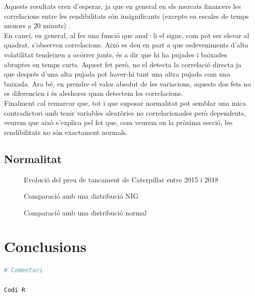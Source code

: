 \documentclass{article}
\numberwithin{table}{section}
\numberwithin{figure}{section}
\numberwithin{equation}{section}
\begin{document}
Aquests resultats eren d'esperar, ja que en general en els mercats financers les correlacions entre les rendibilitats són insignificants (excepte en escales de temps menors a 20 minuts) \cite{20}.\\
En canvi, en general, al fer una funció que anul·li el signe, com pot ser elevar al quadrat, s’observen correlacions. Això es deu en part a que esdeveniments d’alta volatilitat tendeixen a ocórrer junts, és a dir que hi ha pujades i baixades abruptes en temps curts. Aquest fet però, no el detecta la correlació directa ja que després d’una alta pujada pot haver-hi tant una altra pujada com una baixada. Ara bé, en prendre el valor absolut de les variacions, aquests dos fets no es diferencien i és aleshores quan detectem les correlacions.\\
Finalment cal remarcar que, tot i que suposar normalitat pot semblar una mica contradictori amb tenir variables aleatòries no correlacionades però dependents, veurem que això s’explica pel fet que, com veurem en la pròxima secció, les rendibilitats no són exactament normals.







\subsection{Normalitat}%




\begin{figure}[H]
	\centering \sffamily \small
	
	\caption{Evolució del preu de tancament de Caterpillar entre 2015 i 2018}
	\label{fig:distribucio rendibilitats}
\end{figure}
\begin{figure}[H]
	\centering \sffamily \small
	
	\caption{Comparació amb una distribució NIG}
	\label{fig:comparacio nig}
\end{figure}
\begin{figure}[H]
	\centering \sffamily \small
	
	\caption{Comparació amb una distribució normal}
	\label{fig:comparacio normal}
\end{figure}

\section{Conclusions}
\newpage







\begin{lstlisting}[language=R]
# Comentari

Codi R
\end{lstlisting}

%
%
\printbibliography[heading = biblio]
\end{document}

